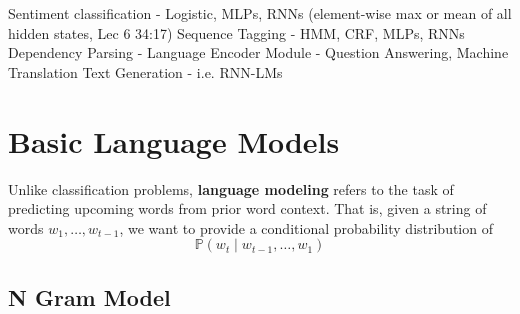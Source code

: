 \documentclass{article}
\begin{document}
  Sentiment classification - Logistic, MLPs, RNNs (element-wise max or mean of all hidden states, Lec 6 34:17) 
  Sequence Tagging - HMM, CRF, MLPs, RNNs
  Dependency Parsing - 
  Language Encoder Module - Question Answering, Machine Translation 
  Text Generation - i.e. RNN-LMs

\section{Basic Language Models}

  Unlike classification problems, \textbf{language modeling} refers to the task of predicting upcoming words from prior word context. That is, given a string of words $w_1, \ldots, w_{t-1}$, we want to provide a conditional probability distribution of 
  \[\mathbb{P}(w_t \mid w_{t-1}, \ldots, w_1 )\]

  \subsection{N Gram Model}
\end{document}
